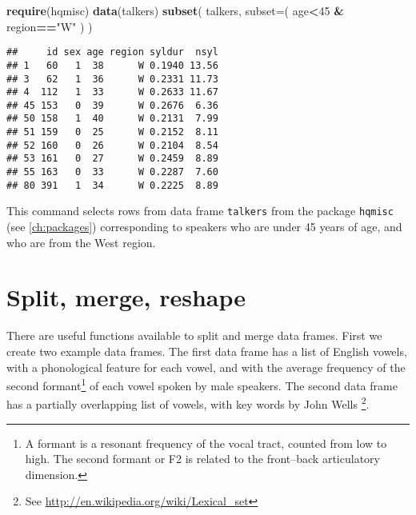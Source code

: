 \documentclass[]{book}
\newenvironment{Shaded}{\begin{snugshade}}{\end{snugshade}}
\newcommand{\DataTypeTok}[1]{\textcolor[rgb]{0.13,0.29,0.53}{#1}}
\newcommand{\DecValTok}[1]{\textcolor[rgb]{0.00,0.00,0.81}{#1}}
\newcommand{\KeywordTok}[1]{\textcolor[rgb]{0.13,0.29,0.53}{\textbf{#1}}}
\newcommand{\NormalTok}[1]{#1}
\newcommand{\OperatorTok}[1]{\textcolor[rgb]{0.81,0.36,0.00}{\textbf{#1}}}
\newcommand{\StringTok}[1]{\textcolor[rgb]{0.31,0.60,0.02}{#1}}
\begin{document}
\begin{Shaded}
\begin{Highlighting}[]
\KeywordTok{require}\NormalTok{(hqmisc)}
\KeywordTok{data}\NormalTok{(talkers)}
\KeywordTok{subset}\NormalTok{( talkers, }\DataTypeTok{subset=}\NormalTok{( age}\OperatorTok{<}\DecValTok{45} \OperatorTok{&}\StringTok{ }\NormalTok{region}\OperatorTok{==}\StringTok{"W"}\NormalTok{ ) )}
\end{Highlighting}
\end{Shaded}

\begin{verbatim}
##     id sex age region syldur  nsyl
## 1   60   1  38      W 0.1940 13.56
## 3   62   1  36      W 0.2331 11.73
## 4  112   1  33      W 0.2633 11.67
## 45 153   0  39      W 0.2676  6.36
## 50 158   1  40      W 0.2131  7.99
## 51 159   0  25      W 0.2152  8.11
## 52 160   0  26      W 0.2104  8.54
## 53 161   0  27      W 0.2459  8.89
## 55 163   0  33      W 0.2287  7.60
## 80 391   1  34      W 0.2225  8.89
\end{verbatim}

This command selects rows from data frame \texttt{talkers} from the package \texttt{hqmisc}\\
(see \ref{ch:packages}) corresponding to speakers who are under 45 years of age, and who are from the West region.

\hypertarget{sec:split.merge.reshape}{%
\section{Split, merge, reshape}\label{sec:split.merge.reshape}}

There are useful functions available to split and merge data frames.
First we create two example data frames. The first data frame has a list
of English vowels, with a phonological feature for each vowel, and with the average frequency of the second formant\footnote{A formant is a resonant frequency of the vocal tract, counted from low to high. The second formant or F2 is related to the front--back articulatory dimension.} of each vowel \citep{pete52} spoken by male speakers. The second data frame has a partially overlapping list of vowels, with key words by John Wells \footnote{See \url{http://en.wikipedia.org/wiki/Lexical_set}}.
\end{document}
